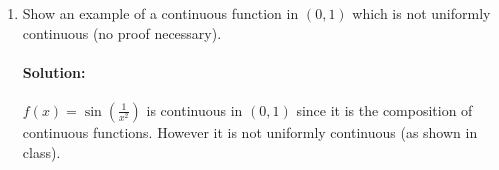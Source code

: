 \documentclass{article}
\begin{document}
\begin{enumerate}
\begin{enumerate}
\begin{proof}
                \begin{align*}
                    |y-x|&=y-x&\text{Since }y>x\\
                    &= \sqrt{\pi k+\frac{\pi}{2}} -\sqrt{\pi k}  \\
                    &= \frac{\left( \sqrt{\pi k+\frac{\pi}{2}} -\sqrt{\pi k} \right) 
                    \left( \sqrt{\pi k+\frac{\pi}{2}} +\sqrt{\pi k} \right)}
                    {\left( \sqrt{\pi k+\frac{\pi}{2}} +\sqrt{\pi k} \right)} \\
                    &=\frac{\pi k +\frac{\pi}{2}-\pi k}
                    {\left( \sqrt{\pi k+\frac{\pi}{2}} +\sqrt{\pi k} \right)} \\
                    &=\frac{\frac{\pi}{2}} { \sqrt{\pi k+\frac{\pi}{2}} +\sqrt{\pi k} } \\
                    &=\frac{\sqrt{\pi} } {2\left( \sqrt{ k+\frac{1}{2}} +\sqrt{ k}\right) } \\
                    &< \frac{\sqrt{ \pi}} {2\left(\sqrt{k} +\sqrt{  k}\right) }&
                    \sqrt{x} \text{ is monotinically increasing}  \\
                    &<\frac{\sqrt{\pi} }{4\sqrt{k} } \\
                    &< \frac{1}{\sqrt{k}}&\text{Since }\frac{\sqrt{\pi} }{4}<1\\
                    &<\delta
                .\end{align*}
            \end{proof}
            Therefore $\sin x^2$ is not uniformly continuous on $[0,\infty)$

        \item Show an example of a continuous function in $(0,1)$ which is not uniformly
            continuous (no proof necessary).

            \paragraph{Solution:} $f(x)=\sin\left( \frac{1}{x^2} \right) $ is continuous in $(0,1)$
            since it is the composition of continuous functions. However
            it is not uniformly continuous (as shown in class).
    \end{enumerate}

\end{enumerate}
\end{document}
